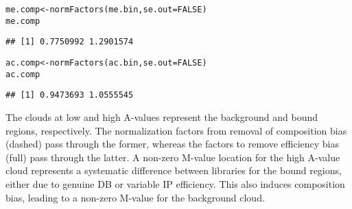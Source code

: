 \documentclass{report}\usepackage[]{graphicx}\usepackage[usenames,dvipsnames]{color}
\newcommand{\hlnum}[1]{\textcolor[rgb]{0.816,0.125,0.439}{#1}}%
\newcommand{\hlstd}[1]{\textcolor[rgb]{0.251,0.251,0.251}{#1}}%
\newcommand{\hlkwb}[1]{\textcolor[rgb]{0,0,0}{#1}}%
\newcommand{\hlkwc}[1]{\textcolor[rgb]{0.251,0.251,0.251}{#1}}%
\newcommand{\hlkwd}[1]{\textcolor[rgb]{0.878,0.439,0.125}{#1}}%
\newenvironment{knitrout}{}{} %
\begin{document}
\begin{knitrout}
\color{fgcolor}\begin{kframe}
\begin{alltt}
\hlstd{me.comp} \hlkwb{<-} \hlkwd{normFactors}\hlstd{(me.bin,} \hlkwc{se.out}\hlstd{=}\hlnum{FALSE}\hlstd{)}
\hlstd{me.comp}
\end{alltt}
\begin{verbatim}
## [1] 0.7750992 1.2901574
\end{verbatim}
\begin{alltt}
\hlstd{ac.comp} \hlkwb{<-} \hlkwd{normFactors}\hlstd{(ac.bin,} \hlkwc{se.out}\hlstd{=}\hlnum{FALSE}\hlstd{)}
\hlstd{ac.comp}
\end{alltt}
\begin{verbatim}
## [1] 0.9473693 1.0555545
\end{verbatim}
\end{kframe}
\end{knitrout}

The clouds at low and high A-values represent the background and bound regions, respectively.
The normalization factors from removal of composition bias (dashed) pass through the former, whereas the factors to remove efficiency bias (full) pass through the latter.
A non-zero M-value location for the high A-value cloud represents a systematic difference between libraries for the bound regions, either due to genuine DB or variable IP efficiency. 
This also induces composition bias, leading to a non-zero M-value for the background cloud.
\end{document}
